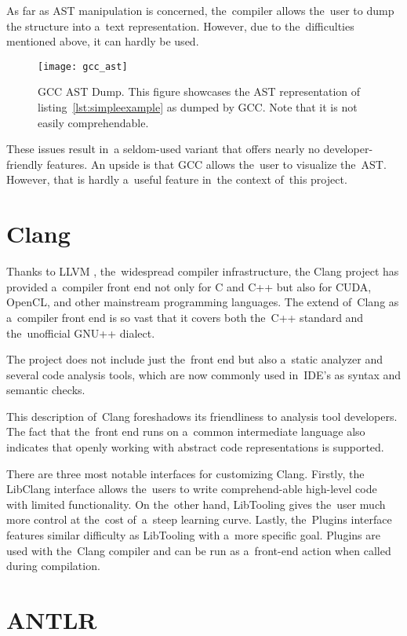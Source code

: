 As far as AST manipulation is concerned, the~compiler allows the~user to dump 
the structure into a~text representation. 
However, due to the~difficulties mentioned above, it can hardly be used.

\begin{figure}[p]\centering
\texttt{[image: gcc\_ast]}
\caption{GCC AST Dump. This figure showcases 
the AST representation of listing~\ref{lst:simpleexample}
as dumped by GCC. Note that it is not easily comprehendable.}
\label{img:gcc}
\end{figure}

These issues result in~a seldom-used variant that offers nearly 
no developer-friendly features. 
An upside is that GCC allows the~user to visualize the~AST. 
However, that is hardly a~useful feature in~the context of~this project.

\section{Clang}

Thanks to LLVM \citep{llvm:online}, the~widespread compiler infrastructure,
the Clang project \citep{clang:online}
has provided a~compiler front end not only for C and C++ but also 
for CUDA, OpenCL, and other mainstream programming languages. 
The extend of~Clang as a~compiler front end is so vast that it covers 
both the~C++ standard and the~unofficial GNU++ dialect.

The project does not include just the~front end but also a~static analyzer 
and several code analysis tools, which are now commonly used in~IDE's as 
syntax and semantic checks. 

This description of~Clang foreshadows its friendliness to analysis tool developers. 
The fact that the~front end runs on a~common intermediate language also indicates 
that openly working with abstract code representations is supported.

There are three most notable interfaces for customizing Clang. 
Firstly, the LibClang interface allows the~users to write 
comprehend-able high-level code with limited functionality. 
On the~other hand, LibTooling gives the~user much more control 
at the~cost of~a~steep learning curve. 
Lastly, the~Plugins interface features similar difficulty 
as LibTooling with a~more specific goal. 
Plugins are used with the~Clang compiler and can be run 
as a~front-end action when called during compilation.

\section{ANTLR}

